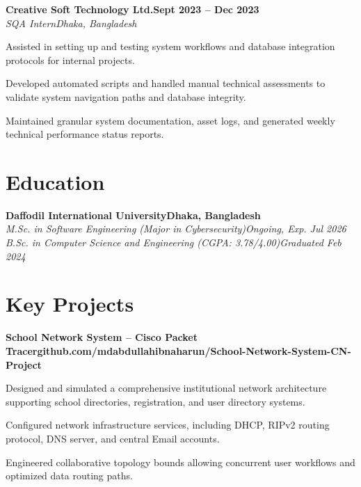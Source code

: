 \documentclass[letterpaper,10pt]{article}
\newcommand{\heading}[2]{\hspace{10pt}#1\hfill#2\\}
\newcommand{\headingBf}[2]{\heading{\textbf{#1}}{\textbf{#2}}}
\newcommand{\headingIt}[2]{\heading{\textit{#1}}{\textit{#2}}}
\newenvironment{resume_list}{
  \vspace{-7pt}
  \begin{itemize}[itemsep=-2px, parsep=1pt, leftmargin=30pt]
}{
  \end{itemize}
}
\begin{document}
\headingBf{Creative Soft Technology Ltd.}{Sept 2023 -- Dec 2023}
\headingIt{SQA Intern}{Dhaka, Bangladesh}
\begin{resume_list}
  \item Assisted in setting up and testing system workflows and database integration protocols for internal projects.
  \item Developed automated scripts and handled manual technical assessments to validate system navigation paths and database integrity.
  \item Maintained granular system documentation, asset logs, and generated weekly technical performance status reports.
\end{resume_list}

\section{Education}
\headingBf{Daffodil International University}{Dhaka, Bangladesh}
\headingIt{M.Sc. in Software Engineering (Major in Cybersecurity)}{Ongoing, Exp. Jul 2026}
\headingIt{B.Sc. in Computer Science and Engineering (CGPA: 3.78/4.00)}{Graduated Feb 2024}

\section{Key Projects}

\headingBf{School Network System -- Cisco Packet Tracer}{github.com/mdabdullahibnaharun/School-Network-System-CN-Project}
\begin{resume_list}
  \item Designed and simulated a comprehensive institutional network architecture supporting school directories, registration, and user directory systems.
  \item Configured network infrastructure services, including DHCP, RIPv2 routing protocol, DNS server, and central Email accounts.
  \item Engineered collaborative topology bounds allowing concurrent user workflows and optimized data routing paths.
\end{resume_list}

\vspace{12pt}
\vspace{12pt}
\vspace{12pt}
\vspace{12pt}
\vspace{12pt}
\vspace{12pt}
\vspace{12pt}
\end{document}
